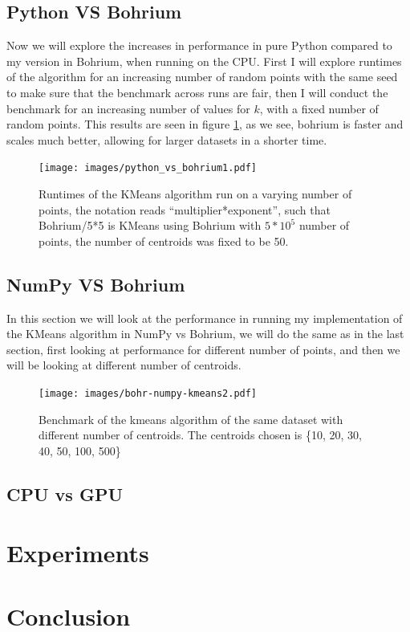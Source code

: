 \documentclass[12pt]{report}
\begin{document}
\section{Python VS Bohrium}
\label{sec:pyvbohrium}
Now we will explore the increases in performance in pure Python compared to my version in Bohrium, when running on the CPU. First I will explore runtimes of the algorithm for an increasing number of random points with the same seed to make sure that the benchmark across runs are fair, then I will conduct the benchmark for an increasing number of values for $k$, with a fixed number of random points. This results are seen in figure \ref{fig:pythonvsbohrium}, as we see, bohrium is faster and scales much better, allowing for larger datasets in a shorter time.

\begin{figure}[H]
  \centering
  \texttt{[image: images/python\_vs\_bohrium1.pdf]}
  \caption{\label{fig:pythonvsbohrium}Runtimes of the KMeans algorithm run on a varying number of points, the notation reads ``multiplier*exponent'', such that Bohrium/5*5 is KMeans using Bohrium with $5*10^5$ number of points, the number of centroids was fixed to be 50.}
\end{figure}

\section{NumPy VS Bohrium}
\label{sec:numpyvsbohrium}
In this section we will look at the performance in  running my implementation of the KMeans algorithm in  NumPy vs Bohrium, we will do the same as in the last section, first looking at performance for different number of points, and then we will be looking at different number of centroids.

\begin{figure}[H]
  \centering
  \texttt{[image: images/bohr-numpy-kmeans2.pdf]}
  \caption{\label{fig:bohriumvsnumpy}Benchmark of the kmeans algorithm of the same dataset with different number of centroids. The centroids chosen is \{10, 20, 30, 40, 50, 100, 500\}}
\end{figure}



\section{CPU vs GPU}
\label{sec:cpugpu}





\chapter{Experiments}
\label{sec:experi}

\chapter{Conclusion}
\label{sec:label}



\newpage



\end{document}
